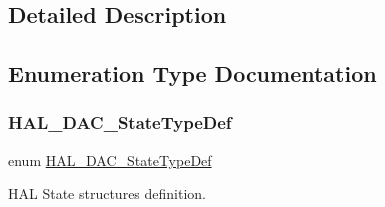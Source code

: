 \subsection{Detailed Description}


\subsection{Enumeration Type Documentation}
\mbox{\label{group___d_a_c___exported___types_ga4e917340aba1cc3afd4e9a7fef15e4a5}} 
\subsubsection{\texorpdfstring{HAL\_DAC\_StateTypeDef}{HAL\_DAC\_StateTypeDef}}
{\footnotesize\ttfamily enum \mbox{\hyperlink{group___d_a_c___exported___types_ga4e917340aba1cc3afd4e9a7fef15e4a5}{H\+A\+L\+\_\+\+D\+A\+C\+\_\+\+State\+Type\+Def}}}



H\+AL State structures definition. 

